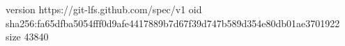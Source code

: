 version https://git-lfs.github.com/spec/v1
oid sha256:fa65dfba5054fff0d9afe4417889b7d67f39d747b589d354e80db01ae3701922
size 43840
